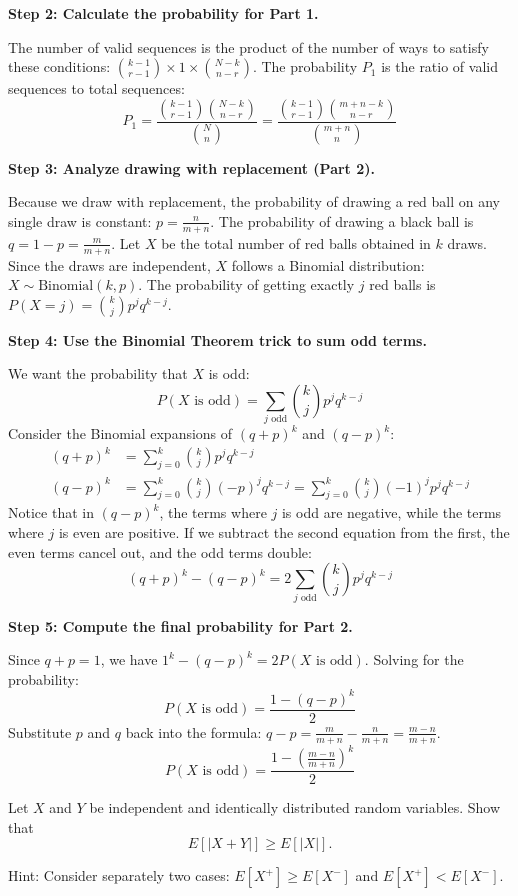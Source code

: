 \begin{solution}
\textbf{Step 2: Calculate the probability for Part 1.}

The number of valid sequences is the product of the number of ways to satisfy these conditions: $\binom{k-1}{r-1} \times 1 \times \binom{N-k}{n-r}$.
The probability $P_1$ is the ratio of valid sequences to total sequences:
\[ P_1 = \frac{\binom{k-1}{r-1} \binom{N-k}{n-r}}{\binom{N}{n}} = \frac{\binom{k-1}{r-1} \binom{m+n-k}{n-r}}{\binom{m+n}{n}} \]

\textbf{Step 3: Analyze drawing with replacement (Part 2).}

Because we draw with replacement, the probability of drawing a red ball on any single draw is constant: $p = \frac{n}{m+n}$.
The probability of drawing a black ball is $q = 1 - p = \frac{m}{m+n}$.
Let $X$ be the total number of red balls obtained in $k$ draws. Since the draws are independent, $X$ follows a Binomial distribution: $X \sim \text{Binomial}(k, p)$.
The probability of getting exactly $j$ red balls is $P(X = j) = \binom{k}{j} p^j q^{k-j}$.

\textbf{Step 4: Use the Binomial Theorem trick to sum odd terms.}

We want the probability that $X$ is odd:
\[ P(X \text{ is odd}) = \sum_{j \text{ odd}} \binom{k}{j} p^j q^{k-j} \]
Consider the Binomial expansions of $(q+p)^k$ and $(q-p)^k$:
\begin{align*}
(q+p)^k &= \sum_{j=0}^k \binom{k}{j} p^j q^{k-j} \\
(q-p)^k &= \sum_{j=0}^k \binom{k}{j} (-p)^j q^{k-j} = \sum_{j=0}^k \binom{k}{j} (-1)^j p^j q^{k-j}
\end{align*}
Notice that in $(q-p)^k$, the terms where $j$ is odd are negative, while the terms where $j$ is even are positive.
If we subtract the second equation from the first, the even terms cancel out, and the odd terms double:
\[ (q+p)^k - (q-p)^k = 2 \sum_{j \text{ odd}} \binom{k}{j} p^j q^{k-j} \]

\textbf{Step 5: Compute the final probability for Part 2.}

Since $q+p = 1$, we have $1^k - (q-p)^k = 2 P(X \text{ is odd})$.
Solving for the probability:
\[ P(X \text{ is odd}) = \frac{1 - (q-p)^k}{2} \]
Substitute $p$ and $q$ back into the formula: $q-p = \frac{m}{m+n} - \frac{n}{m+n} = \frac{m-n}{m+n}$.
\[ P(X \text{ is odd}) = \frac{1 - \left(\frac{m-n}{m+n}\right)^k}{2} \]
\end{solution}

\begin{exercise}\label{probability:2011:4}
Let $X$ and $Y$ be independent and identically distributed random variables. Show that
\[
E[|X+Y|] \geq E[|X|].
\]

Hint: Consider separately two cases: $E[X^+] \geq E[X^-]$ and $E[X^+] < E[X^-]$.
\end{exercise}

